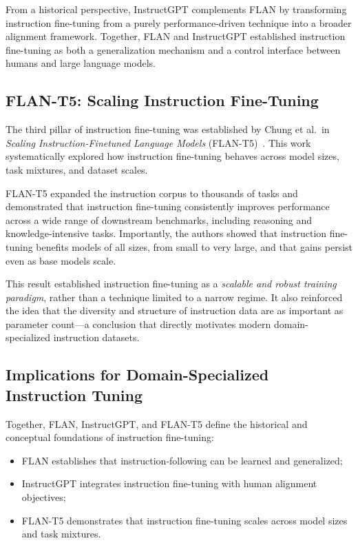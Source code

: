 \documentclass[10pt]{article}
\begin{document}
From a historical perspective, InstructGPT complements FLAN by transforming instruction fine-tuning from a purely performance-driven technique into a broader alignment framework. Together, FLAN and InstructGPT established instruction fine-tuning as both a generalization mechanism and a control interface between humans and large language models.

\subsection{FLAN-T5: Scaling Instruction Fine-Tuning}

The third pillar of instruction fine-tuning was established by Chung et al.\ in \emph{Scaling Instruction-Finetuned Language Models} (FLAN-T5)~\cite{chung2022flant5}. This work systematically explored how instruction fine-tuning behaves across model sizes, task mixtures, and dataset scales.

FLAN-T5 expanded the instruction corpus to thousands of tasks and demonstrated that instruction fine-tuning consistently improves performance across a wide range of downstream benchmarks, including reasoning and knowledge-intensive tasks. Importantly, the authors showed that instruction fine-tuning benefits models of all sizes, from small to very large, and that gains persist even as base models scale.

This result established instruction fine-tuning as a \emph{scalable and robust training paradigm}, rather than a technique limited to a narrow regime. It also reinforced the idea that the diversity and structure of instruction data are as important as parameter count—a conclusion that directly motivates modern domain-specialized instruction datasets.

\subsection{Implications for Domain-Specialized Instruction Tuning}

Together, FLAN, InstructGPT, and FLAN-T5 define the historical and conceptual foundations of instruction fine-tuning:
\begin{itemize}[leftmargin=*]
  \item FLAN establishes that instruction-following can be learned and generalized;
  \item InstructGPT integrates instruction fine-tuning with human alignment objectives;
  \item FLAN-T5 demonstrates that instruction fine-tuning scales across model sizes and task mixtures.
\end{itemize}
\end{document}
